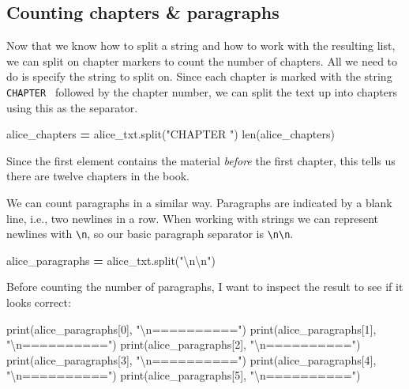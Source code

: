 \documentclass[]{book}
\newenvironment{Shaded}{\begin{snugshade}}{\end{snugshade}}
\newcommand{\DecValTok}[1]{\textcolor[rgb]{0.00,0.00,0.81}{#1}}
\newcommand{\CharTok}[1]{\textcolor[rgb]{0.31,0.60,0.02}{#1}}
\newcommand{\StringTok}[1]{\textcolor[rgb]{0.31,0.60,0.02}{#1}}
\newcommand{\OperatorTok}[1]{\textcolor[rgb]{0.81,0.36,0.00}{\textbf{#1}}}
\newcommand{\BuiltInTok}[1]{#1}
\newcommand{\NormalTok}[1]{#1}
\begin{document}
\subsection{Counting chapters \&
paragraphs}\label{counting-chapters-paragraphs}

Now that we know how to split a string and how to work with the
resulting list, we can split on chapter markers to count the number of
chapters. All we need to do is specify the string to split on. Since
each chapter is marked with the string
\texttt{\textquotesingle{}CHAPTER\ \textquotesingle{}} followed by the
chapter number, we can split the text up into chapters using this as the
separator.

\begin{Shaded}
\begin{Highlighting}[]
\NormalTok{alice_chapters }\OperatorTok{=}\NormalTok{ alice_txt.split(}\StringTok{"CHAPTER "}\NormalTok{)}
\BuiltInTok{len}\NormalTok{(alice_chapters)}
\end{Highlighting}
\end{Shaded}

Since the first element contains the material \emph{before} the first
chapter, this tells us there are twelve chapters in the book.

We can count paragraphs in a similar way. Paragraphs are indicated by a
blank line, i.e., two newlines in a row. When working with strings we
can represent newlines with \texttt{\textbackslash{}n}, so our basic
paragraph separator is \texttt{\textbackslash{}n\textbackslash{}n}.

\begin{Shaded}
\begin{Highlighting}[]
\NormalTok{alice_paragraphs }\OperatorTok{=}\NormalTok{ alice_txt.split(}\StringTok{"}\CharTok{\textbackslash{}n\textbackslash{}n}\StringTok{"}\NormalTok{)}
\end{Highlighting}
\end{Shaded}

Before counting the number of paragraphs, I want to inspect the result
to see if it looks correct:

\begin{Shaded}
\begin{Highlighting}[]
\BuiltInTok{print}\NormalTok{(alice_paragraphs[}\DecValTok{0}\NormalTok{], }\StringTok{"}\CharTok{\textbackslash{}n}\StringTok{=========="}\NormalTok{)}
\BuiltInTok{print}\NormalTok{(alice_paragraphs[}\DecValTok{1}\NormalTok{], }\StringTok{"}\CharTok{\textbackslash{}n}\StringTok{=========="}\NormalTok{)}
\BuiltInTok{print}\NormalTok{(alice_paragraphs[}\DecValTok{2}\NormalTok{], }\StringTok{"}\CharTok{\textbackslash{}n}\StringTok{=========="}\NormalTok{)}
\BuiltInTok{print}\NormalTok{(alice_paragraphs[}\DecValTok{3}\NormalTok{], }\StringTok{"}\CharTok{\textbackslash{}n}\StringTok{=========="}\NormalTok{)}
\BuiltInTok{print}\NormalTok{(alice_paragraphs[}\DecValTok{4}\NormalTok{], }\StringTok{"}\CharTok{\textbackslash{}n}\StringTok{=========="}\NormalTok{)}
\BuiltInTok{print}\NormalTok{(alice_paragraphs[}\DecValTok{5}\NormalTok{], }\StringTok{"}\CharTok{\textbackslash{}n}\StringTok{=========="}\NormalTok{)}
\end{Highlighting}
\end{Shaded}
\end{document}
